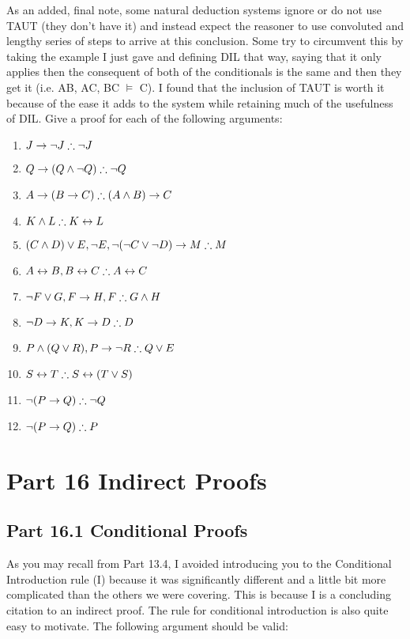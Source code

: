As an added, final note, some natural deduction systems ignore or do not use TAUT (they don't have it) and instead expect the reasoner to use convoluted and lengthy series of steps to arrive at this conclusion. Some try to circumvent this by taking the example I just gave and defining DIL that way, saying that it only applies then the consequent of both of the conditionals is the same and then they get it (i.e. A\eor B, A\eif C, B\eif C $\vDash$ C). I found that the inclusion of TAUT is worth it because of the ease it adds to the system while retaining much of the usefulness of DIL.
\practiceproblems
\problempart
\label{pr.solvedTFLproofs}
Give a proof for each of the following arguments:
\begin{enumerate}
\item $J\eif\enot J \therefore \enot J$
\item $Q\eif(Q\eand\enot Q) \therefore \enot Q$
\item $A\eif (B\eif C) \therefore (A\eand B)\eif C$
\item $K\eand L \therefore K\eiff L$
\item $(C\eand D)\eor E, \enot E, \enot(\enot C\eor \enot D)\eif M \therefore M$
\item $A\eiff B, B\eiff C \therefore A\eiff C$
\item $\enot F\eor G, F\eif H, F \therefore G\eand H$
\item $\enot D\eif K, K \eif D \therefore D$
\item $P \eand (Q\eor R), P\eif \enot R \therefore Q\eor E$
\item $S\eiff T \therefore S\eiff (T\eor S)$
\item $\enot (P \eif Q) \therefore \enot Q$
\item $\enot (P \eif Q) \therefore P$
\end{enumerate}



\chapter{Part 16 Indirect Proofs}
\section{Part 16.1 Conditional Proofs}
As you may recall from Part 13.4, I avoided introducing you to the Conditional Introduction rule (\eif I) because it was significantly different and a little bit more complicated than the others we were covering. This is because \eif I is a concluding citation to an indirect proof. The rule for conditional introduction is also quite easy to motivate. The following argument should be valid:

